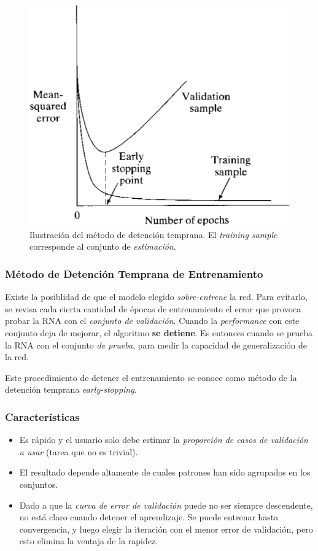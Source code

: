 \documentclass[10pt,a4paper]{article}
\begin{document}
\begin{figure}
  \caption{Ilustración del método de detención temprana. El \textit{training sample} corresponde al conjunto de \textit{estimación}.}
  \label{fig:cross_validation}
  \centering
  \hbox{\includegraphics[width=0.45\textwidth-\fboxrule-\fboxrule]{imgs/cross_validation.png}}
\end{figure}

\subsubsection{Método de Detención Temprana de Entrenamiento}

Existe la posiblidad de que el modelo elegido \textit{sobre-entrene} la red. Para evitarlo, se revisa cada cierta cantidad de épocas de entrenamiento el error que provoca probar la RNA con el \textit{conjunto de validación}. Cuando la \textit{performance} con este conjunto deja de mejorar, el algoritmo \textbf{se detiene}. Es entonces cuando se prueba la RNA con el conjunto \textit{de prueba}, para medir la capacidad de generalización de la red.

Este procedimiento de detener el entrenamiento se conoce como método de la detención temprana \textit{early-stopping}.

\subsubsection{Características}

\begin{itemize}
\item Es rápido y el usuario solo debe estimar la \textit{proporción de casos de validación a usar} (tarea que no es trivial).
\end{itemize}

\begin{itemize}
\item El resultado depende altamente de cuales patrones han sido agrupados en los conjuntos.
\item Dado a que la \textit{curva de error de validación} puede no ser siempre descendente, no está claro cuando detener el aprendizaje. Se puede entrenar hasta convergencia, y luego elegir la iteración con el menor error de validación, pero esto elimina la ventaja de la rapidez.
\end{itemize}
\end{document}
